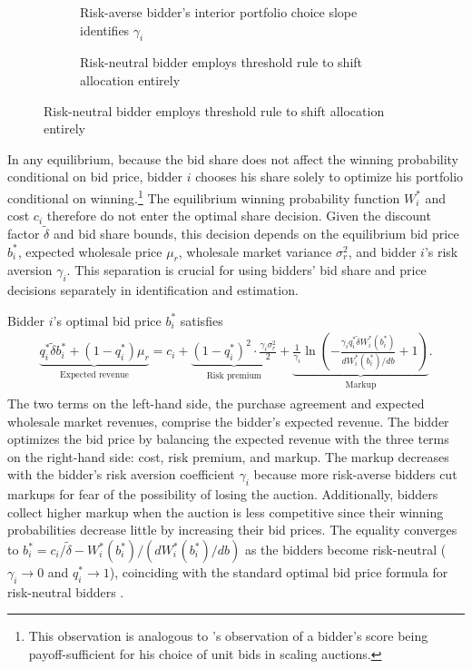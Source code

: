 \documentclass[12pt]{article}
\theoremstyle{definition} %
\begin{document}
\begin{figure}[htb!]
\caption{Optimal bid share rules when $\underline{q} = 0$}
\label{fig:portfolio}
\centering
\begin{subfigure}{0.49\textwidth}
\caption{Risk-averse bidder's interior portfolio choice slope identifies $\gamma_i$}
\label{fig:portfolioaverse}
\resizebox{\textwidth}{!}{}
\end{subfigure}
\hfill
\begin{subfigure}{0.49\textwidth}
\caption{Risk-neutral bidder employs threshold rule to shift allocation entirely}
\label{fig:portfolioneutral}
\resizebox{\textwidth}{!}{}
\end{subfigure}
\end{figure}

In any equilibrium, because the bid share does not affect the winning probability conditional on bid price, bidder $i$ chooses his share solely to optimize his portfolio conditional on winning.\footnote{
This observation is analogous to \citet{Bolotnyy2023}'s observation of a bidder's score being payoff-sufficient for his choice of unit bids in scaling auctions.
} The equilibrium winning probability function $W_i^\ast$ and cost $c_i$ therefore do not enter the optimal share decision. Given the discount factor $\tilde{\delta}$ and bid share bounds, this decision depends on the equilibrium bid price $b_i^\ast$, expected wholesale price $\mu_r$, wholesale market variance $\sigma_r^2$, and bidder $i$'s risk aversion $\gamma_i$. This separation is crucial for using bidders' bid share and price decisions separately in identification and estimation.

Bidder $i$'s optimal bid price $b_i^\ast$ satisfies
\begin{align}
\label{eq:optbsb}
\underbrace{q_i^\ast \tilde{\delta} b_i^\ast + (1 - q_i^\ast)\mu_r}_{\substack{\text{Expected revenue}}} 
= c_i 
+ \underbrace{(1-q_i^\ast)^2 \cdot \frac{\gamma_i \sigma_r^2}{2}}_{\substack{\text{Risk premium}}} 
+ \underbrace{\frac{1}{\gamma_i} \ln \left(-\frac{\gamma_i q_i^\ast \tilde{\delta} W_i^\ast(b_i^\ast)}{dW_i^\ast(b_i^\ast)/d b} + 1 \right)}_{\substack{\text{Markup}}}.
\end{align}
The two terms on the left-hand side, the purchase agreement and expected wholesale market revenues, comprise the bidder's expected revenue. The bidder optimizes the bid price by balancing the expected revenue with the three terms on the right-hand side: cost, risk premium, and markup. The markup decreases with the bidder's risk aversion coefficient $\gamma_i$ because more risk-averse bidders cut markups for fear of the possibility of losing the auction. Additionally, bidders collect higher markup when the auction is less competitive since their winning probabilities decrease little by increasing their bid prices. The equality converges to $b_i^\ast = c_i/\tilde{\delta} - W_i^\ast(b_i^\ast)/(dW_i^\ast(b_i^\ast)/d b)$ as the bidders become risk-neutral ($\gamma_i \to 0$ and $q_i^\ast \to 1$), coinciding with the standard optimal bid price formula for risk-neutral bidders \citep[e.g.,][]{Athey2007}.
\end{document}
